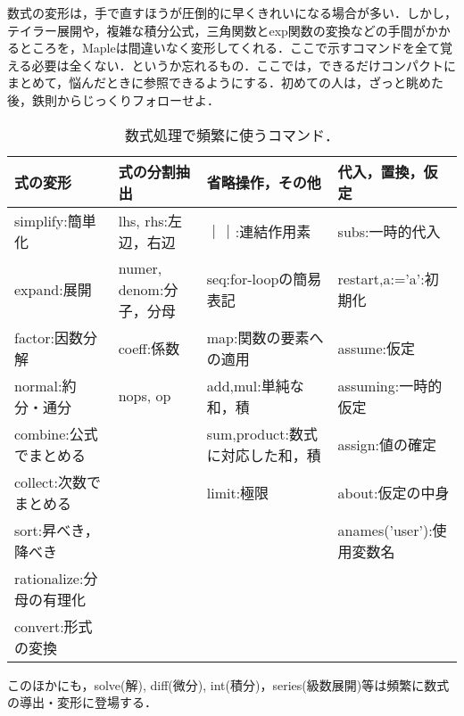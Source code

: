 数式の変形は，手で直すほうが圧倒的に早くきれいになる場合が多い．しかし，テイラー展開や，複雑な積分公式，三角関数とexp関数の変換などの手間がかかるところを，Mapleは間違いなく変形してくれる．ここで示すコマンドを全て覚える必要は全くない．というか忘れるもの．ここでは，できるだけコンパクトにまとめて，悩んだときに参照できるようにする．初めての人は，ざっと眺めた後，鉄則からじっくりフォローせよ．

\begin{table}[htbp]
\caption{数式処理で頻繁に使うコマンド．}
\begin{center}
\begin{tabular}{llll}
\hline
式の変形&式の分割抽出&省略操作，その他 &代入，置換，仮定\\
\hline
simplify:簡単化 &lhs, rhs:左辺，右辺	&｜｜:連結作用素 &subs:一時的代入	\\
expand:展開		&numer, denom:分子，分母&seq:for-loopの簡易表記&restart,a:='a':初期化\\
factor:因数分解	&coeff:係数				&map:関数の要素への適用&assume:仮定			\\
normal:約分・通分 &nops, op				&add,mul:単純な和，積&assuming:一時的仮定\\
combine:公式でまとめる&					&sum,product:数式に対応した和，積&assign:値の確定	\\
collect:次数でまとめる&					&limit:極限&about:仮定の中身	\\
sort:昇べき，降べき&					&	&anames('user'):使用変数名\\
rationalize:分母の有理化\\
convert:形式の変換\\
\hline
\end{tabular}
\end{center}
\label{default}
\end{table}%

このほかにも，solve(解), diff(微分), int(積分)，series(級数展開)等は頻繁に数式の導出・変形に登場する．





